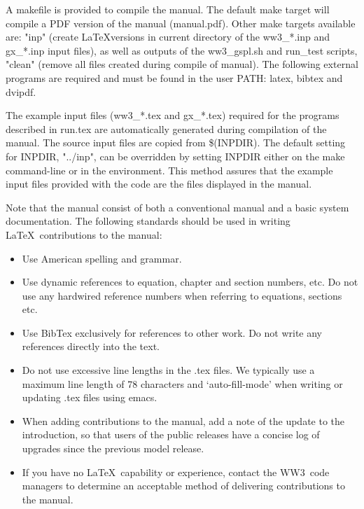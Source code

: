 \documentclass[12pt]{article}
\newcommand{\ws}{WW3}
\newcommand{\file}{\sf}
\begin{document}
\vspace{\baselineskip} \noindent A {\file makefile} is provided to compile the
manual.  The default make target will compile a PDF version of the manual
(manual.pdf).  Other make targets available are: "inp" (create \LaTeX versions
in current directory of the {\file ww3\_*.inp} and {\file gx\_*.inp} input
files), as well as outputs of the {\file ww3\_gspl.sh} and {\file run\_test}
scripts, "clean" (remove all files created during compile of manual).  The
following external programs are required and must be found in the user PATH:
{\file latex}, {\file bibtex} and {\file dvipdf}.

\vspace{\baselineskip} \noindent The example input files ({\file ww3\_*.tex}
and {\file gx\_*.tex}) required for the programs described in {\file run.tex}
are automatically generated during compilation of the manual. The source input
files are copied from {\file \$(INPDIR)}.  The default setting for {\file
  INPDIR}, "../inp", can be overridden by setting {\file INPDIR} either on the
make command-line or in the environment. This method assures that the example
input files provided with the code are the files displayed in the manual.

\vspace{\baselineskip} \noindent Note that the manual consist of both a
conventional manual and a basic system documentation. The following standards
should be used in writing \LaTeX\ contributions to the manual:

\begin{itemize}
\item Use American spelling and grammar.
\item Use dynamic references to equation, chapter and section numbers, etc. Do
      not use any hardwired reference numbers when referring to equations,
      sections etc.
\item Use BibTex exclusively for references to other work. Do not write any
      references directly into the text.
\item Do not use excessive line lengths in the {\file .tex} files. We
      typically use a maximum line length of 78 characters and
      `auto-fill-mode' when writing or updating {\file .tex} files using
      emacs. 
\item When adding contributions to the manual, add a note of the
      update to the introduction, so that users of the public releases
      have a concise log of upgrades since the previous model release.
\item If you have no \LaTeX\ capability or experience, contact the \ws\ code
      managers to determine an acceptable method of delivering contributions
      to the manual.
\end{itemize}
\end{document}
